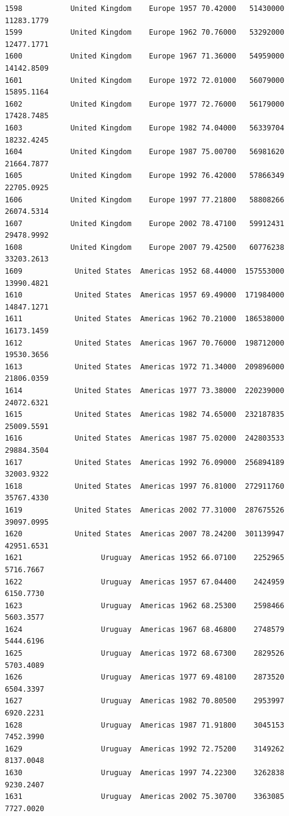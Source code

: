 \documentclass[
  letterpaper,
  DIV=11,
  numbers=noendperiod]{scrreprt}
\begin{document}
\begin{verbatim}
1598           United Kingdom    Europe 1957 70.42000   51430000  11283.1779
1599           United Kingdom    Europe 1962 70.76000   53292000  12477.1771
1600           United Kingdom    Europe 1967 71.36000   54959000  14142.8509
1601           United Kingdom    Europe 1972 72.01000   56079000  15895.1164
1602           United Kingdom    Europe 1977 72.76000   56179000  17428.7485
1603           United Kingdom    Europe 1982 74.04000   56339704  18232.4245
1604           United Kingdom    Europe 1987 75.00700   56981620  21664.7877
1605           United Kingdom    Europe 1992 76.42000   57866349  22705.0925
1606           United Kingdom    Europe 1997 77.21800   58808266  26074.5314
1607           United Kingdom    Europe 2002 78.47100   59912431  29478.9992
1608           United Kingdom    Europe 2007 79.42500   60776238  33203.2613
1609            United States  Americas 1952 68.44000  157553000  13990.4821
1610            United States  Americas 1957 69.49000  171984000  14847.1271
1611            United States  Americas 1962 70.21000  186538000  16173.1459
1612            United States  Americas 1967 70.76000  198712000  19530.3656
1613            United States  Americas 1972 71.34000  209896000  21806.0359
1614            United States  Americas 1977 73.38000  220239000  24072.6321
1615            United States  Americas 1982 74.65000  232187835  25009.5591
1616            United States  Americas 1987 75.02000  242803533  29884.3504
1617            United States  Americas 1992 76.09000  256894189  32003.9322
1618            United States  Americas 1997 76.81000  272911760  35767.4330
1619            United States  Americas 2002 77.31000  287675526  39097.0995
1620            United States  Americas 2007 78.24200  301139947  42951.6531
1621                  Uruguay  Americas 1952 66.07100    2252965   5716.7667
1622                  Uruguay  Americas 1957 67.04400    2424959   6150.7730
1623                  Uruguay  Americas 1962 68.25300    2598466   5603.3577
1624                  Uruguay  Americas 1967 68.46800    2748579   5444.6196
1625                  Uruguay  Americas 1972 68.67300    2829526   5703.4089
1626                  Uruguay  Americas 1977 69.48100    2873520   6504.3397
1627                  Uruguay  Americas 1982 70.80500    2953997   6920.2231
1628                  Uruguay  Americas 1987 71.91800    3045153   7452.3990
1629                  Uruguay  Americas 1992 72.75200    3149262   8137.0048
1630                  Uruguay  Americas 1997 74.22300    3262838   9230.2407
1631                  Uruguay  Americas 2002 75.30700    3363085   7727.0020

\end{verbatim}
\end{document}

